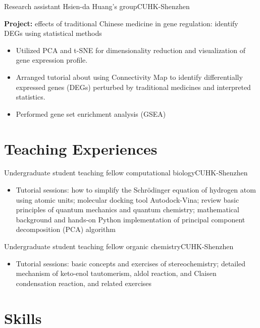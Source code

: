 \documentclass[12pt,a4paper,sans]{moderncv}
\newcommand\linksymbol{\scriptsize\faExternalLink*}
\newcommand{\cvsection}[1]{\section{{#1}}}
\begin{document}
{Research assistant}{}
{Hsien-da Huang's group}{CUHK-Shenzhen}
{\small
    \textbf{Project:} effects of traditional Chinese medicine in gene regulation:
    identify DEGs using statistical methods
    \begin{itemize}[itemsep=4pt]
        \item Utilized PCA and t-SNE for dimensionality reduction and visualization of gene expression profile.
        \item Arranged tutorial about using Connectivity Map to identify differentially expressed genes (DEGs) perturbed by
        traditional medicines and interpreted statistics.
        \item Performed gene set enrichment analysis (GSEA)
    \end{itemize}
}

\cvsection{Teaching Experiences}
{Undergraduate student teaching fellow}{}
{computational biology}{CUHK-Shenzhen}
{
    \begin{itemize}[itemsep=2pt]
        \item Tutorial sessions: how to simplify the 
        Schrödinger equation of hydrogen atom using
        atomic units; molecular docking tool Autodock-Vina;
        review basic principles of quantum mechanics and quantum chemistry;
        mathematical background and hands-on Python implementation of principal component decomposition (PCA) algorithm
        \href{https://github.com/haoran0115/pca-implementation}{\linksymbol}
    \end{itemize}
}
{Undergraduate student teaching fellow}{}
{organic chemistry}{CUHK-Shenzhen}
{
    \begin{itemize}[itemsep=2pt]
        \item Tutorial sessions: basic concepts and exercises of stereochemistry;
        detailed mechanism of keto-enol tautomerism, aldol reaction,
        and Claisen condensation reaction, and related exercises
    \end{itemize}
}

\cvsection{Skills}
\end{document}

